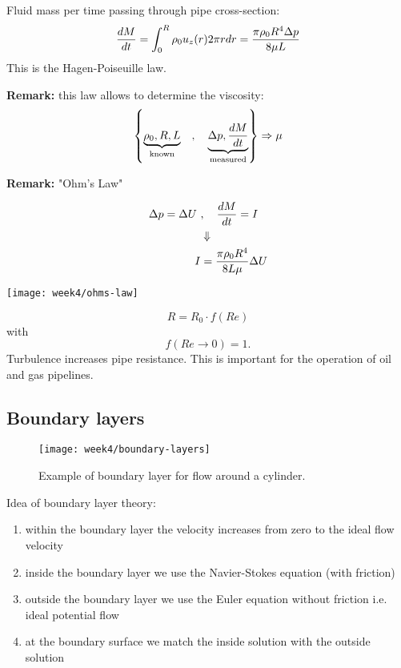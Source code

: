 Fluid mass per time passing through pipe cross-section:
\begin{equation}
\frac{d M}{d t} = \int_0^R\rho_0 u_z(r)2\pi r dr = \frac{\pi\rho_0 R^4\Delta p}{8\mu L}
\end{equation}
This is the Hagen-Poiseuille law.
\begin{framed}
\textbf{Remark:} this law allows to determine the viscosity:
\begin{equation}
\left\lbrace \underbrace{\rho_0,R,L}_\mathrm{known} \quad,\quad \underbrace{\Delta p,\frac{d M}{d t}}_\mathrm{measured} \right\rbrace \Rightarrow \mu
\end{equation}
\end{framed}

\begin{framed}
\textbf{Remark:} "Ohm's Law"

\begin{align}
\Delta p = \Delta U \ &,\quad \frac{d M}{d t} = I\\
&\Downarrow\notag\\
I &= \frac{\pi\rho_0 R^4}{8L\mu} \Delta U
\end{align}

{\center
\texttt{[image: week4/ohms-law]}\\
}

\begin{equation}
R = R_0\cdot f(Re)
\end{equation}
with
\begin{equation}
f(Re\rightarrow0)=1.
\end{equation}
Turbulence increases pipe resistance. This is important for the operation of oil and gas pipelines.
\end{framed}



\newpage
\subsection{Boundary layers}

\begin{figure}[ht]
    \centering
    \texttt{[image: week4/boundary-layers]}\\
    \caption{Example of boundary layer for flow around a cylinder.}
    \label{fig:boundary-layers}
\end{figure}

Idea of boundary layer theory:
\begin{enumerate}
\item within the boundary layer the velocity increases from zero to the ideal flow velocity
\item inside the boundary layer we use the Navier-Stokes equation (with friction)
\item outside the boundary layer we use the Euler equation without friction i.e. ideal potential flow
\item at the boundary surface we match the inside solution with the outside solution
\end{enumerate}

